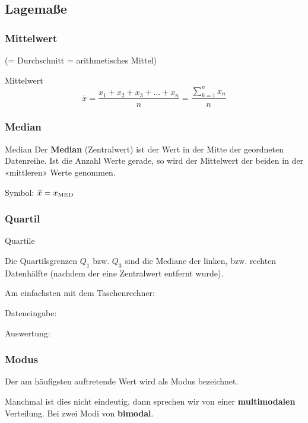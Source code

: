 \hrulefill
\begin{multicols}{2}

\subsection*{Lagemaße}
\subsubsection*{Mittelwert}
(= Durchschnitt = arithmetisches Mittel)

\begin{definition*}{Mittelwert}{}
$$\overline{x} = \frac{x_1 + x_2 + x_3 + ... + x_n}{n}= \frac{\sum_{k=1}^nx_n}n$$
\end{definition*}

\subsubsection*{Median}
\begin{definition*}{Median}{}
Der \textbf{Median} (Zentralwert) ist der Wert in der Mitte der geordneten Datenreihe. Ist
die Anzahl Werte gerade, so wird der Mittelwert der beiden in der
«mittleren» Werte genommen.

Symbol: $\widetilde{x} = x_{\textrm{MED}}$
\end{definition*}

\subsubsection*{Quartil}

\begin{rezept*}{Quartile}{}

Die Quartilsgrenzen $Q_1$ bzw. $Q_3$ sind die Mediane der linken,
bzw. rechten Datenhälfte (nachdem der eine Zentralwert entfernt
wurde).

Am einfachsten mit dem Taschenrechner:

Dateneingabe: 

Auswertung: 
\end{rezept*}

\subsubsection*{Modus}
Der am häufigsten auftretende Wert wird als Modus bezeichnet.

Manchmal ist dies nicht eindeutig, dann sprechen wir von einer
\textbf{multimodalen} Verteilung. Bei zwei Modi von \textbf{bimodal}.


\end{multicols}
